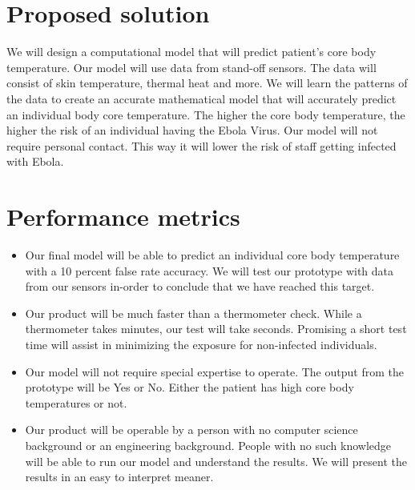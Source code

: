 \documentclass{article}
\begin{document}
\section{Proposed solution}
We will design a computational model that will predict patient’s core body temperature. Our model will use data from stand-off sensors. The data will consist of skin temperature, thermal heat and more. We will learn the patterns of the data to create an accurate mathematical model that will accurately predict an individual body core temperature. The higher the core body temperature, the higher the risk of an individual having the Ebola Virus. Our model will not require personal contact. This way it will lower the risk of staff getting infected with Ebola. 

\section{Performance metrics}
\begin{itemize}
\item Our final model will be able to predict an individual core body temperature with a 10 percent false rate accuracy. We will test our prototype with data from our sensors in-order to conclude that we have reached this target.
\item Our product will be much faster than a thermometer check. While a thermometer takes minutes, our test will take seconds. Promising a short test time will assist in minimizing the exposure for non-infected individuals.  
\item Our model will not require special expertise to operate. The output from the prototype will be Yes or No. Either the patient has high core body temperatures or not. 
\item Our product will be operable by a person with no computer science background or an engineering background. People with no such knowledge will be able to run our model and understand the results. We will present the results in an easy to interpret meaner. 
 
\end{itemize}
\end{document}
